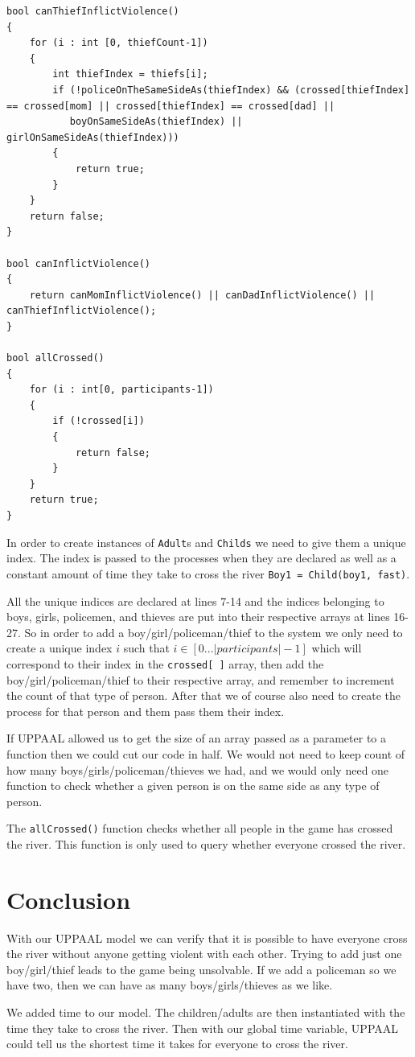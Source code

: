 \documentclass[a4paper,12pt]{article}
\begin{document}
\begin{lstlisting}[caption={Global declarations}]
bool canThiefInflictViolence()
{
    for (i : int [0, thiefCount-1])
    {
        int thiefIndex = thiefs[i];
        if (!policeOnTheSameSideAs(thiefIndex) && (crossed[thiefIndex] == crossed[mom] || crossed[thiefIndex] == crossed[dad] ||
           boyOnSameSideAs(thiefIndex) || girlOnSameSideAs(thiefIndex)))
        {
            return true;
        }
    }
    return false;
}

bool canInflictViolence()
{
    return canMomInflictViolence() || canDadInflictViolence() || canThiefInflictViolence();
}

bool allCrossed()
{
    for (i : int[0, participants-1])
    {
        if (!crossed[i])
        {
            return false;
        }
    }
    return true;
}
\end{lstlisting}

In order to create instances of \lstinline|Adult|s and \lstinline|Childs| we need to give them a unique index. The index is passed to the processes when they are declared as well as a constant amount of time they take to cross the river \lstinline|Boy1 = Child(boy1, fast)|.

All the unique indices are declared at lines 7-14 and the indices belonging to boys, girls, policemen, and thieves are put into their respective arrays at lines 16-27. So in order to add a boy/girl/policeman/thief to the system we only need to create a unique index $i$ such that $i \in [0 ... |participants|-1]$ which will correspond to their index in the \lstinline|crossed[ ]| array, then add the boy/girl/policeman/thief to their respective array, and remember to increment the count of that type of person. After that we of course also need to create the process for that person and them pass them their index.

If UPPAAL allowed us to get the size of an array passed as a parameter to a function then we could cut our code in half. We would not need to keep count of how many boys/girls/policeman/thieves we had, and we would only need one function to check whether a given person is on the same side as any type of person.

The \lstinline|allCrossed()| function checks whether all people in the game has crossed the river. This function is only used to query whether everyone crossed the river.

\section*{Conclusion}

With our UPPAAL model we can verify that it is possible to have everyone cross the river without anyone getting violent with each other. Trying to add just one boy/girl/thief leads to the game being unsolvable. If we add a policeman so we have two, then we can have as many boys/girls/thieves as we like.

We added time to our model. The children/adults are then instantiated with the time they take to cross the river. Then with our global time variable, UPPAAL could tell us the shortest time it takes for everyone to cross the river.
\end{document}
